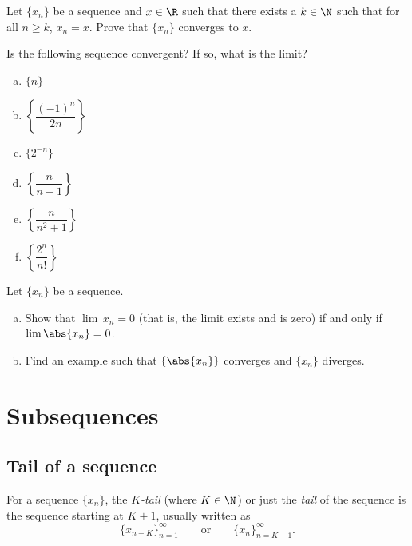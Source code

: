 \documentclass[12pt]{book}
\begin{document}
\begin{exercise}[Easy]
Let $\{ x_n \}$ be a sequence and $x \in \R$ such that
there exists a $k \in \N$ such that for all $n \geq k$,
$x_n = x$.
Prove that $\{ x_n \}$ converges to $x$.
\end{exercise}

\begin{exercise}
Is the following sequence convergent?  
If so, what is the limit?

\begin{enumerate}[a)]
\item $\{ n \}$
\item $\left\{ \dfrac{{(-1)}^n}{2n} \right\}$
\item $\{ 2^{-n} \}$
\item $\left\{ \dfrac{n}{n+1} \right\}$
\item $\left\{ \dfrac{n}{n^2+1} \right\}$
\item $\left\{ \dfrac{2^n}{n!} \right\}$
\end{enumerate}

\end{exercise}



\begin{exercise} \label{exercise:absconv}
Let $\{ x_n \}$ be a sequence.
\begin{enumerate}[a)]
\item Show that $\lim\, x_n = 0$ (that is, the limit exists and is zero)
if and only if $\lim \abs{x_n} = 0$.
\item Find an example such that $\{ \abs{x_n} \}$ converges and $\{ x_n \}$
diverges.
\end{enumerate}
\end{exercise}

\sectionnewpage
\section{Subsequences}
\subsection*{Tail of a sequence}

\begin{defn}
For a sequence $\{ x_n \}$,
the \emph{$K$-tail} (where $K \in \N$)
or just the
\emph{tail} of
the sequence is the sequence starting at $K+1$, usually written as
\begin{equation*}
\{ x_{n+K} \}_{n=1}^\infty
\qquad \text{or} \qquad \{ x_n \}_{n=K+1}^\infty .
\end{equation*}
\end{defn}
\end{document}
